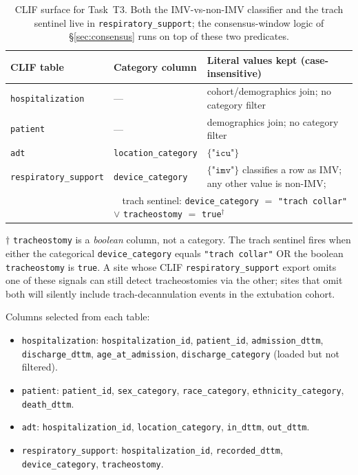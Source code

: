 \documentclass[11pt]{article}
\begin{document}
\begin{table}[H]
\centering
\small
\begin{tabular}{@{}llp{7.0cm}@{}}
\toprule
\textbf{CLIF table} & \textbf{Category column} & \textbf{Literal values kept (case-insensitive)} \\
\midrule
\texttt{hospitalization}    & ---                       & cohort/demographics join; no category filter \\
\texttt{patient}            & ---                       & demographics join; no category filter \\
\texttt{adt}                & \texttt{location\_category} & $\{\texttt{"icu"}\}$ \\
\texttt{respiratory\_support} & \texttt{device\_category} &
$\{\texttt{"imv"}\}$ classifies a row as IMV; any other value is
non-IMV; \\
& \multicolumn{2}{l}{$\;\;$ trach sentinel: \texttt{device\_category} $=$
\texttt{"trach collar"} $\vee$ \texttt{tracheostomy} $=$ \texttt{true}$^{\dagger}$} \\
\bottomrule
\end{tabular}
\caption{CLIF surface for Task~T3. Both the IMV-vs-non-IMV classifier
and the trach sentinel live in \texttt{respiratory\_support}; the
consensus-window logic of \S\ref{sec:consensus} runs on top of these
two predicates.}
\end{table}

$\dagger$ \texttt{tracheostomy} is a \emph{boolean} column, not a
category. The trach sentinel fires when either the categorical
\texttt{device\_category} equals \texttt{"trach collar"} OR the boolean
\texttt{tracheostomy} is \texttt{true}. A site whose CLIF
\texttt{respiratory\_support} export omits one of these signals can
still detect tracheostomies via the other; sites that omit both will
silently include trach-decannulation events in the extubation cohort.

Columns selected from each table:
\begin{itemize}[leftmargin=2em, itemsep=0pt]
  \item \texttt{hospitalization}: \texttt{hospitalization\_id},
        \texttt{patient\_id}, \texttt{admission\_dttm},
        \texttt{discharge\_dttm}, \texttt{age\_at\_admission},
        \texttt{discharge\_category} (loaded but not filtered).
  \item \texttt{patient}: \texttt{patient\_id},
        \texttt{sex\_category}, \texttt{race\_category},
        \texttt{ethnicity\_category}, \texttt{death\_dttm}.
  \item \texttt{adt}: \texttt{hospitalization\_id},
        \texttt{location\_category}, \texttt{in\_dttm},
        \texttt{out\_dttm}.
  \item \texttt{respiratory\_support}: \texttt{hospitalization\_id},
        \texttt{recorded\_dttm}, \texttt{device\_category},
        \texttt{tracheostomy}.
\end{itemize}
\end{document}
